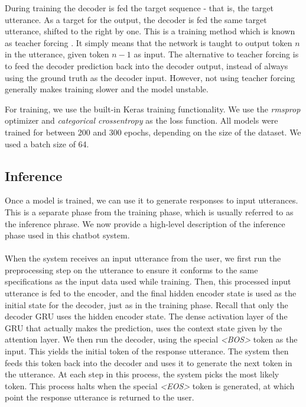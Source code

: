 \documentclass{article}
\begin{document}
During training the decoder is fed the target sequence - that is, the target
utterance. As a target for the output, the decoder is fed the same target utterance, shifted to the right by one.
This is a training method which is known as teacher forcing
\cite{teacher-forcing}. It simply means that the network is taught to output
token $n$ in the utterance, given token $n-1$ as input. The alternative to
teacher forcing is to feed the decoder prediction back into the decoder output,
instead of always using the ground truth as the decoder input. However, not
using teacher forcing generally makes training slower and the model unstable.

For training, we use the built-in Keras training functionality. We use the
\emph{rmsprop} optimizer and \emph{categorical crossentropy} as the loss
function. All models were trained for between 200 and 300 epochs, depending
on the size of the dataset. We used a batch size of 64.

\subsection*{Inference}

Once a model is trained, we can use it to generate responses to input
utterances. This is a separate phase from the training phase, which is usually
referred to as the inference phrase. We now provide a high-level description
of the inference phase used in this chatbot system.

\paragraph{}
When the system receives an input utterance from the user, we first run the
preprocessing step on the utterance to ensure it conforms to the same
specifications as the input data used while training. Then, this processed
input utterance is fed to the encoder, and the final hidden encoder state is
used as the initial state for the decoder, just as in the training phase.
Recall that only the decoder GRU uses the hidden encoder state. The dense
activation layer of the GRU that actually makes the prediction, uses the
context state given by the attention layer. We then run the decoder, using the
special \emph{<BOS>} token as the input. This yields the initial token of the
response utterance. The system then feeds this token back into the decoder and
uses it to generate the next token in the utterance. At each step in this
process, the system picks the most likely token. This process halts when the
special \emph{<EOS>} token is generated, at which point the response utterance
is returned to the user.
\end{document}
